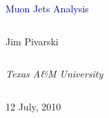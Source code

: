 \documentclass[compress]{beamer}
\begin{document}
\begin{frame}
\vfill
\begin{center}
\textcolor{darkblue}{\Large Muon Jets Analysis}

\vfill
\begin{columns}
\begin{center}
\large
Jim Pivarski
\end{center}
\end{columns}

\begin{columns}
\begin{center}
\scriptsize
{\it Texas A\&M University}
\end{center}
\end{columns}

\vfill
12 July, 2010

\end{center}
\end{frame}


\small
\end{document}

